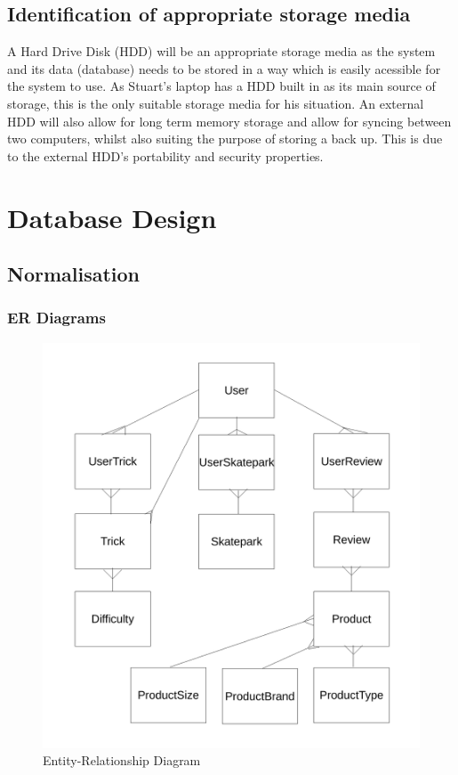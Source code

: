 \subsection{Identification of appropriate storage media}

A Hard Drive Disk (HDD) will be an appropriate storage media as the system and its data (database) needs to be stored in a way which is easily acessible for the system to use. As Stuart's laptop has a HDD built in as its main source of storage, this is the only suitable storage media for his situation. An external HDD will also allow for long term memory storage and allow for syncing between two computers, whilst also suiting the purpose of storing a back up. This is due to the external HDD's portability and security properties. 

\section{Database Design}

\subsection{Normalisation}








\subsubsection{ER Diagrams}

\begin{figure}[H]
    \includegraphics[width=\textwidth]{./Design/EntityRelationships2.pdf}
    \caption{Entity-Relationship Diagram} \label{fig:Entity Diagram}
\end{figure}

